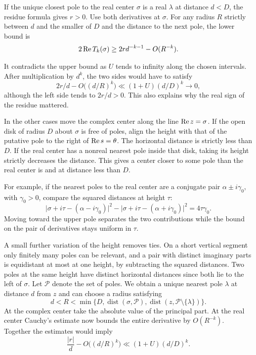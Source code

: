 If the unique closest pole to the real center \(\sigma\) is a real
\(\lambda\) at distance \(d<D\), the residue formula gives
\(r>0\). Use both derivatives at \(\sigma\). For any radius \(R\)
strictly between \(d\) and the smaller of \(D\) and the distance to
the next pole, the lower bound is
\[
          2\operatorname{Re} T_k(\sigma)\ge 2r d^{-k-1}-O(R^{-k}).
\]

It contradicts the upper bound as \(U\) tends to infinity along the
chosen intervals. After multiplication by \(d^k\), the two sides would have to satisfy
\[
    2r/d-O\bigl((d/R)^k\bigr)\ll(1+U)(d/D)^k\longrightarrow0 ,
\]
although the left side tends to \(2r/d>0\). This also explains why the real
sign of the residue mattered.

In the other cases move the complex center along the line
\(\operatorname{Re} z=\sigma\). If the open disk of radius \(D\) about
\(\sigma\) is free of poles, align the height with that of the
putative pole to the right of \(\operatorname{Re} s=\theta\). The horizontal
distance is strictly less than \(D\). If the real center has a
nonreal nearest pole inside that disk, taking its height strictly
decreases the distance. This gives a center closer to some pole
than the real center is and at distance less than \(D\).

For example, if the nearest poles to the real center are a
conjugate pair \(\alpha\pm i\gamma_0\), with \(\gamma_0>0\), compare
the squared distances at height \(\tau\):
\[
 \big|\sigma+i\tau-(\alpha-i\gamma_0)\big|^2-
 \big|\sigma+i\tau-(\alpha+i\gamma_0)\big|^2=4\tau\gamma_0 .
\]
Moving toward the upper pole separates the two contributions while the
bound on the pair of derivatives stays uniform in \(\tau\).

A small further variation of the height removes ties. On a short
vertical segment only finitely many poles can be relevant, and a
pair with distinct imaginary parts is equidistant at most at one
height, by subtracting the squared distances. Two poles at the same
height have distinct horizontal distances since both lie to the left
of \(\sigma\). Let \(\mathcal P\) denote the set of poles. We obtain a unique
nearest pole \(\lambda\) at distance \(d\) from \(z\) and can choose
a radius satisfying
\[
 d<R<\min\{D,\operatorname{dist}(\sigma,\mathcal P),
                    \operatorname{dist}(z,\mathcal P\setminus\{\lambda\})\}.
\] At the complex center take
the absolute value of the principal part. At the real center
Cauchy's estimate now bounds the entire derivative by \(O(R^{-k})\).
Together the estimates would imply
\[
       \frac{|r|}{d}-O\bigl((d/R)^k\bigr)
                        \ll(1+U)(d/D)^k .
\]

